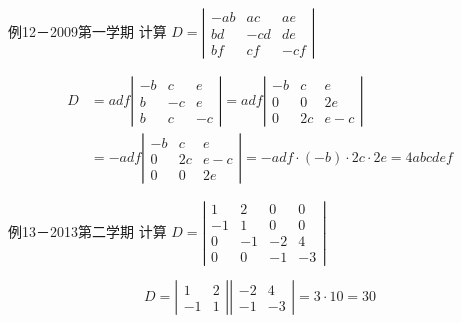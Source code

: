 \begin{frame}
  \begin{footnotesize}
    \begin{exampleblock}{例12－2009第一学期}
      计算
      $
      D=\left|
      \begin{array}{rrr}
        -ab&ac&ae\\
        bd&-cd&de\\
        bf&cf&-cf
      \end{array}
      \right|
      $
    \end{exampleblock}
    \pause\jiename
    $$
    \begin{array}{rl}
    D&=adf\left|
      \begin{array}{rrr}
        -b&c&e\\
        b&-c&e\\
        b&c&-c
      \end{array}
      \right|=adf\left|
      \begin{array}{rrr}
        -b&c&e\\
        0&0&2e\\
        0&2c&e-c
      \end{array}
      \right|\\[0.2in]
      &=-adf\left|
      \begin{array}{rrr}
        -b&c&e\\
        0&2c&e-c\\
        0&0&2e
      \end{array}
      \right|  
      =-adf\cdot(-b)\cdot 2c \cdot 2e=4abcdef
    \end{array}
    $$
  \end{footnotesize}
\end{frame}




\begin{frame}
  \begin{footnotesize}
    \begin{exampleblock}{例13－2013第二学期}
      计算
      $
      D=\left|
      \begin{array}{rrrr}
        1&2&0&0\\
        -1&1&0&0\\
        0&-1&-2&4\\
        0&0&-1&-3
      \end{array}
      \right|
      $
    \end{exampleblock}
    \pause\jiename
    $$
    D=\left|
    \begin{array}{rr}
      1&2\\
      -1&1
    \end{array}
    \right|\left|
    \begin{array}{rr}
      -2&4\\
      -1&-3
    \end{array}
    \right|=3\cdot10=30
    $$
  \end{footnotesize}
\end{frame}


